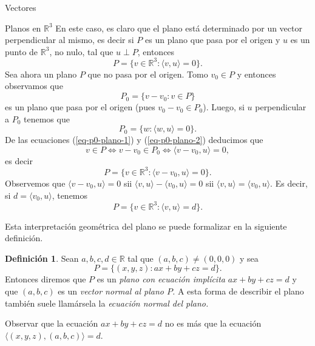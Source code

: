 \documentclass[a4paper,12pt,twoside,spanish]{amsbook}
\theoremstyle{definition}
\newtheorem{definicion}{Definici\'on}[section]
\theoremstyle{remark}
\newcommand{\la}{\langle}
\newcommand{\ra}{\rangle}
\newcommand{\R}{\mathbb R}
\begin{document}
\begin{chapter}{Vectores}
\begin{section}{Planos en $\R^3$}
		En  este caso,  es claro que el plano está determinado por un vector perpendicular al mismo, es decir si $P$  es un plano que pasa por el origen y $u$ es un punto de $\R^3$, no nulo, tal que $u \perp P$,  entonces
		\begin{equation*}
			P = \{ v \in \R^3: \la v,u \ra=0 \}. 
		\end{equation*}
		Sea ahora un  plano $P$ que no pasa por el origen.  Tomo $v_0 \in P$ y entonces observamos que
		\begin{equation}\label{eq-p0-plano-1}
			P_0 = \{v-v_0: v \in P \}
		\end{equation} 
		es un plano que pasa por el origen (pues $v_0-v_0 \in P_0$). Luego,  si $u$ perpendicular a $P_0$ tenemos que
		\begin{equation}\label{eq-p0-plano-2}
		P_0 = \{w: \la w,u \ra=0\}.
		\end{equation}
		De las ecuaciones (\ref{eq-p0-plano-1}) y  (\ref{eq-p0-plano-2}) deducimos que 
		\begin{equation*}
			v \in P \Leftrightarrow v-v_0 \in P_0 \Leftrightarrow \la v-v_0,u \ra=0,
		\end{equation*}
		 es decir
		\begin{equation*}
			P = \{ v \in \R^3: \la v-v_0,u \ra=0 \}. 
		\end{equation*}  
		Observemos que  $\la v-v_0,u \ra=0$ sii $\la v,u \ra-\la v_0,u \ra=0$ sii $\la v,u \ra=\la v_0,u \ra$. Es decir, si $d = \la v_0,u \ra$, tenemos
		\begin{equation*}
		P = \{ v \in \R^3: \la v,u \ra=d \}. 
		\end{equation*} 
		
		Esta interpretación geométrica del plano se puede formalizar en la siguiente definición.
		
		
		\begin{definicion}\label{def-eq-implicita-plano} Sean $a,b, c,d \in \R$ tal que $(a,b,c) \ne (0,0,0)$ y sea 
		\begin{equation*}
			P = \{(x,y,z): ax +by +cz =d\}.
		\end{equation*}
		Entonces diremos que $P$  es  un \textit{plano con ecuación implícita}\index{plano en $\R^3$!ecuación implícita}  $ax +by +cz =d$ y  que $(a,b,c)$ es un \textit{vector normal al plano $P$.} A esta forma de describir el plano también suele llamársela la \textit{ecuación normal del plano.}
		\end{definicion} 
		
		Observar que la ecuación $ ax +by +cz =d$ no es más que la ecuación $\la(x,y,z),(a,b,c) \ra=d$. 	
		

\end{section}
\end{chapter}
\end{document}
